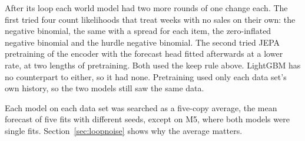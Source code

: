 After its loop each world model had two more rounds of one change each. The first tried four count
likelihoods that treat weeks with no sales on their own: the negative binomial, the same with a
spread for each item, the zero-inflated negative binomial and the hurdle negative binomial. The
second tried JEPA pretraining of the encoder with the forecast head fitted afterwards at a lower
rate, at two lengths of pretraining. Both used the keep rule above. LightGBM has no counterpart
to either, so it had none. Pretraining used only each data set's own history, so the two models
still saw the same data.

Each model on each data set was searched as a five-copy average, the mean forecast of five fits
with different seeds, except on M5, where both models were single fits. Section~\ref{sec:loopnoise} shows why the
average matters.



\ifjournal\else\fi
